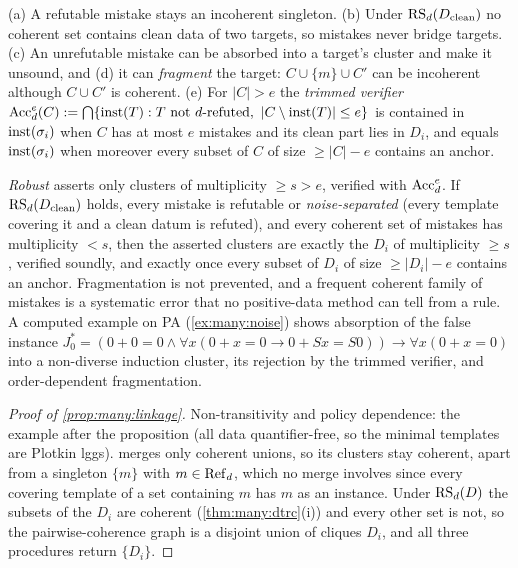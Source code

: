 \begin{proposition}[noise]\label{prop:many:noise}
(a) A refutable mistake stays an incoherent singleton. (b) Under $\mathrm{RS}_d(D_{\mathrm{clean}})$ no coherent set contains clean
data of two targets, so mistakes never bridge targets. (c) An unrefutable mistake can be absorbed into a target's cluster
and make it unsound, and (d) it can \emph{fragment} the target: $C\cup\{m\}\cup C'$ can be incoherent although $C\cup C'$
is coherent. (e) For $|C|>e$ the \emph{trimmed verifier} $\mathrm{Acc}_d^e(C):=\bigcap\{\mathrm{inst}(T):T\text{ not }d\text{-refuted},\
|C\setminus\mathrm{inst}(T)|\le e\}$ is contained in $\mathrm{inst}(\sigma_i)$ when $C$ has at most $e$ mistakes and its clean part lies in
$D_i$, and equals $\mathrm{inst}(\sigma_i)$ when moreover every subset of $C$ of size $\ge|C|-e$ contains an anchor.
\end{proposition}
\emph{Robust} \DTRC{} asserts only clusters of multiplicity $\ge s>e$, verified with $\mathrm{Acc}^e_d$. If $\mathrm{RS}_d(D_{\mathrm{clean}})$
holds, every mistake is refutable or \emph{noise-separated} (every template covering it and a clean datum is refuted), and
every coherent set of mistakes has multiplicity $<s$, then the asserted clusters are exactly the $D_i$ of multiplicity
$\ge s$, verified soundly, and exactly once every subset of $D_i$ of size $\ge|D_i|-e$ contains an anchor. Fragmentation
is not prevented, and a frequent coherent family of mistakes is a systematic error that no positive-data method can tell
from a rule. A computed example on PA (\cref{ex:many:noise}) shows absorption of the false instance
$J^*_0=(0+0=0\wedge\forall x(0+x=0\to0+Sx=S0))\to\forall x(0+x=0)$ into a non-diverse induction cluster, its rejection by
the trimmed verifier, and order-dependent fragmentation.

\begin{proof}[Proof of \cref{prop:many:linkage}]
Non-transitivity and policy dependence: the example after the proposition (all data quantifier-free, so the minimal
templates are Plotkin lggs). \DTRC{} merges only coherent unions, so its clusters stay coherent, apart from a singleton
$\{m\}$ with $m\in\mathrm{Ref}_d$, which no merge involves since every covering template of a set containing $m$ has $m$ as an
instance. Under $\mathrm{RS}_d(D)$ the subsets of the $D_i$ are coherent (\cref{thm:many:dtrc}(i)) and every other set is not, so the
pairwise-coherence graph is a disjoint union of cliques $D_i$, and all three procedures return $\{D_i\}$.
\end{proof}

